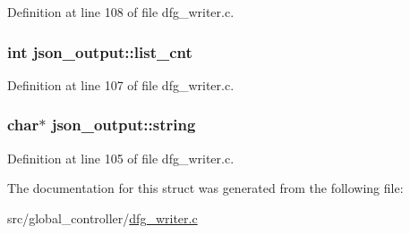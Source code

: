 Definition at line 108 of file dfg\-\_\-writer.\-c.

\hypertarget{structjson__output_a848b0ad7bd9b43c68e4840546dd4af85}{
\subsubsection[{list\-\_\-cnt}]{\setlength{\rightskip}{0pt plus 5cm}int json\-\_\-output\-::list\-\_\-cnt}}\label{structjson__output_a848b0ad7bd9b43c68e4840546dd4af85}


Definition at line 107 of file dfg\-\_\-writer.\-c.

\hypertarget{structjson__output_ab23f3314108564454074ebea87112800}{
\subsubsection[{string}]{\setlength{\rightskip}{0pt plus 5cm}char$\ast$ json\-\_\-output\-::string}}\label{structjson__output_ab23f3314108564454074ebea87112800}


Definition at line 105 of file dfg\-\_\-writer.\-c.



The documentation for this struct was generated from the following file\-:\begin{DoxyCompactItemize}
\item 
src/global\-\_\-controller/\hyperlink{dfg__writer_8c}{dfg\-\_\-writer.\-c}\end{DoxyCompactItemize}
